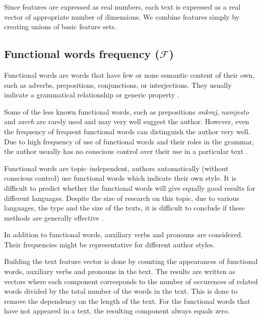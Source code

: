 \documentclass[11pt,english]{article}
\begin{document}
\begin{multicols}{2}
Since features are expressed as real numbers, each text is expressed as a real
vector of appropriate number of dimensions. We combine features simply by creating unions of basic feature sets.



\subsection{Functional words frequency ($\mathcal{F}$)}
\label{sec:funkcijske-rijeci}
Functional words are words that have few or none semantic content of their
own, such as adverbs, prepositions, conjunctions, or interjections. They usually
indicate a grammatical relationship or generic property
\citep{zhao2005effective}.

Some of the less known functional words, such as prepositions \emph{onkraj},
\emph{namjesto} and \emph{zavrh} are rarely used and may very well suggest the
author. However, even the frequency of frequent functional words can distinguish the author very well. Due to high frequency of use of
functional words and their roles in the grammar, the author usually has no
conscious control over their use in a particular text
\citep{argamon2005measuring}.

Functional words are topic--independent, authors automatically (without conscious
control) use functional words which indicate their own style.
It is difficult to predict whether the functional words will give equally good
results for different languages. Despite the size of research on this
topic, due to various languages, the type and the size of the texts, it is
difficult to conclude if these methods are generally effective \citep{zhao2005effective}.

In addition to functional words, auxiliary verbs and pronouns are considered.
Their frequencies might be representative for different author styles.

Building the text feature vector is done by counting the appearances
of functional words, auxiliary verbs and pronouns in the text. The results
are written as vectors where each component corresponds to the number of occurences of
related words divided by the total number of the words in the text. This is done
to remove the dependency on the length of the text. For the functional words that
have not appeared in a text, the resulting component always equals zero.


\end{multicols}
\end{document}
